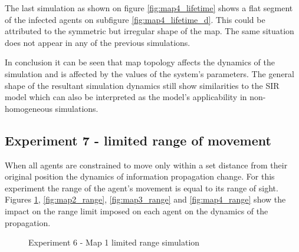 The last simulation as shown on figure \ref{fig:map4_lifetime} shows a flat segment of the infected agents on subfigure \ref{fig:map4_lifetime_d}.
This could be attributed to the symmetric but irregular shape of the map.
The same situation does not appear in any of the previous simulations.

In conclusion it can be seen that map topology affects the dynamics of the simulation and is affected by the values of the system's parameters.
The general shape of the resultant simulation dynamics still show similarities to the SIR model which can also be interpreted as the model's applicability in non-homogeneous simulations.

\subsection{Experiment 7 - limited range of movement}

When all agents are constrained to move only within a set distance from their original position the dynamics of information propagation change.
For this experiment the range of the agent's movement is equal to its range of sight.
Figures \ref{fig:map1_range}, \ref{fig:map2_range}, \ref{fig:map3_range} and \ref{fig:map4_range} show the impact on the range limit imposed on each agent on the dynamics of the propagation.

\begin{figure}[H]
    \centering

    \hspace*{\fill}
    \hspace*{\fill}

    \caption{Experiment 6 - Map 1 limited range simulation}\label{fig:map1_range}
\end{figure}

